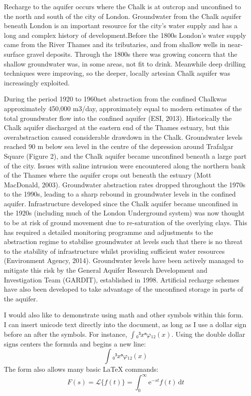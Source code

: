 \documentclass[12pt]{article}
\begin{document}
Recharge to the aquifer occurs where the Chalk is at outcrop and unconfined to the north and south of the city of London. Groundwater from the Chalk aquifer beneath London is an important resource for the city's water supply and has a long and complex history of development.Before the 1800s London's water supply came from the River Thames and its tributaries, and from shallow wells in near-surface gravel deposits. Through the 1800s there was growing concern that the shallow groundwater was, in some areas, not fit to drink. Meanwhile deep drilling techniques were improving, so the deeper, locally artesian Chalk aquifer was increasingly exploited. 

During the period 1920 to 1960net abstraction from the confined Chalkwas approximately 450,000 m3/day, approximately equal to modern estimates of the total groundwater flow into the confined aquifer (ESI, 2013). Historically the Chalk aquifer discharged at the eastern end of the Thames estuary, but this overabstraction caused considerable drawdown in the Chalk. Groundwater levels reached 90 m below sea level in the centre of the depression around Trafalgar Square (Figure 2), and the Chalk aquifer became unconfined beneath a large part of the city. Issues with saline intrusion were encountered along the northern bank of the Thames where the aquifer crops out beneath the estuary (Mott MacDonald, 2003). Groundwater abstraction rates dropped throughout the 1970s to the 1990s, leading to a sharp rebound in groundwater levels in the confined aquifer. Infrastructure developed since the Chalk aquifer became unconfined in the 1920s (including much of the London Underground system) was now thought to be at risk of ground movement due to re-saturation of the overlying clays. This has required a detailed monitoring programme and adjustments to the abstraction regime to stabilise groundwater at levels such that there is no threat to the stability of infrastructure whilst providing sufficient water resources (Environment Agency, 2014). Groundwater levels have been actively managed to mitigate this risk by the General Aquifer Research Development and Investigation Team (GARDIT), established in 1998. Artificial recharge schemes have also been developed to take advantage of the unconfined storage in parts of the aquifer. 

I would also like to demonstrate using math and other symbols within this form. I can insert unicode text directly into the document, as long as I use a dollar sign before an after the symbols. For instance, $∫₀³ xⁿφ₁₂(x)$. Using the double dollar signs centers the formula and begins a new line:
$$ ∫₀³ xⁿφ₁₂(x) $$
The form also allows many basic LaTeX commands:
$$
F(s)=\mathscr L \{f(t)\}=\int_0^\infty \mathrm e^{-st}f(t)\,\mathrm d t 
$$
\end{document}
